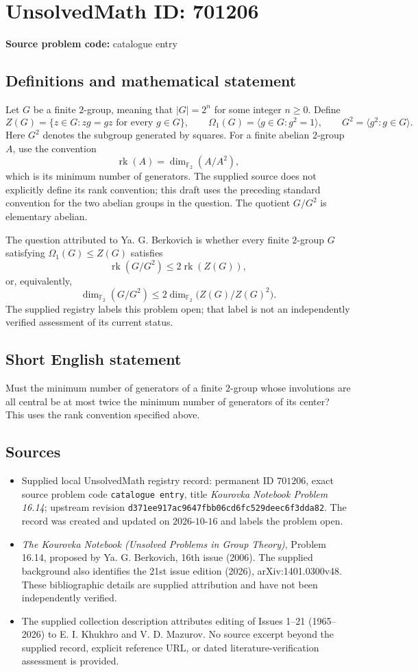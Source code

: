 \documentclass[11pt]{article}
\newcommand{\F}{\mathbb{F}}
\begin{document}
\section*{UnsolvedMath ID: 701206}
\textbf{Source problem code:} catalogue entry
\subsection{Definitions and mathematical statement}
Let \(G\) be a finite \(2\)-group, meaning that \(|G|=2^n\) for some integer \(n\geq 0\). Define
\[
Z(G)=\{z\in G:zg=gz\text{ for every }g\in G\},\qquad
\Omega_1(G)=\langle g\in G:g^2=1\rangle,\qquad
G^2=\langle g^2:g\in G\rangle.
\]
Here \(G^2\) denotes the subgroup generated by squares. For a finite abelian \(2\)-group \(A\), use the convention
\[
\operatorname{rk}(A)=\dim_{\F_2}(A/A^2),
\]
which is its minimum number of generators. The supplied source does not explicitly define its rank convention; this draft uses the preceding standard convention for the two abelian groups in the question. The quotient \(G/G^2\) is elementary abelian.

The question attributed to Ya. G. Berkovich is whether every finite \(2\)-group \(G\) satisfying \(\Omega_1(G)\leq Z(G)\) satisfies
\[
\operatorname{rk}(G/G^2)\leq 2\operatorname{rk}(Z(G)),
\]
or, equivalently,
\[
\dim_{\F_2}(G/G^2)\leq 2\dim_{\F_2}\bigl(Z(G)/Z(G)^2\bigr).
\]
The supplied registry labels this problem open; that label is not an independently verified assessment of its current status.
\subsection{Short English statement}
Must the minimum number of generators of a finite \(2\)-group whose involutions are all central be at most twice the minimum number of generators of its center? This uses the rank convention specified above.
\subsection{Sources}
\begin{itemize}
\item Supplied local UnsolvedMath registry record: permanent ID \(701206\), exact source problem code \texttt{catalogue entry}, title \emph{Kourovka Notebook Problem 16.14}; upstream revision \texttt{d371ee917ac9647fbb06cd6fc529deec6f3dda82}. The record was created and updated on \(2026\text{-}10\text{-}16\) and labels the problem open.
\item \emph{The Kourovka Notebook (Unsolved Problems in Group Theory)}, Problem 16.14, proposed by Ya. G. Berkovich, 16th issue (2006). The supplied background also identifies the 21st issue edition (2026), arXiv:1401.0300v48. These bibliographic details are supplied attribution and have not been independently verified.
\item The supplied collection description attributes editing of Issues 1--21 (1965--2026) to E. I. Khukhro and V. D. Mazurov. No source excerpt beyond the supplied record, explicit reference URL, or dated literature-verification assessment is provided.
\end{itemize}
\end{document}
